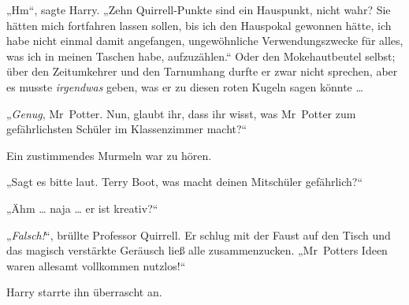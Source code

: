 „Hm“, sagte Harry.
„Zehn Quirrell-Punkte sind ein Hauspunkt, nicht wahr? Sie hätten mich fortfahren lassen sollen, bis ich den Hauspokal gewonnen hätte, ich habe nicht einmal damit angefangen, ungewöhnliche Verwendungszwecke für alles, was ich in meinen Taschen habe, aufzuzählen.“ Oder den Mokehautbeutel selbst; über den Zeitumkehrer und den Tarnumhang durfte er zwar nicht sprechen, aber es musste \emph{irgendwas} geben, was er zu diesen roten Kugeln sagen könnte …

„\emph{Genug}, Mr~Potter. Nun, glaubt ihr, dass ihr wisst, was Mr~Potter zum gefährlichsten Schüler im Klassenzimmer macht?“

Ein zustimmendes Murmeln war zu hören.

„Sagt es bitte laut. Terry Boot, was macht deinen Mitschüler gefährlich?“

„Ähm … naja … er ist kreativ?“

„\emph{Falsch!}“, brüllte Professor Quirrell. Er schlug mit der Faust auf den Tisch und das magisch verstärkte Geräusch ließ alle zusammenzucken.
„Mr~Potters Ideen waren allesamt vollkommen nutzlos!“

Harry starrte ihn überrascht an.

